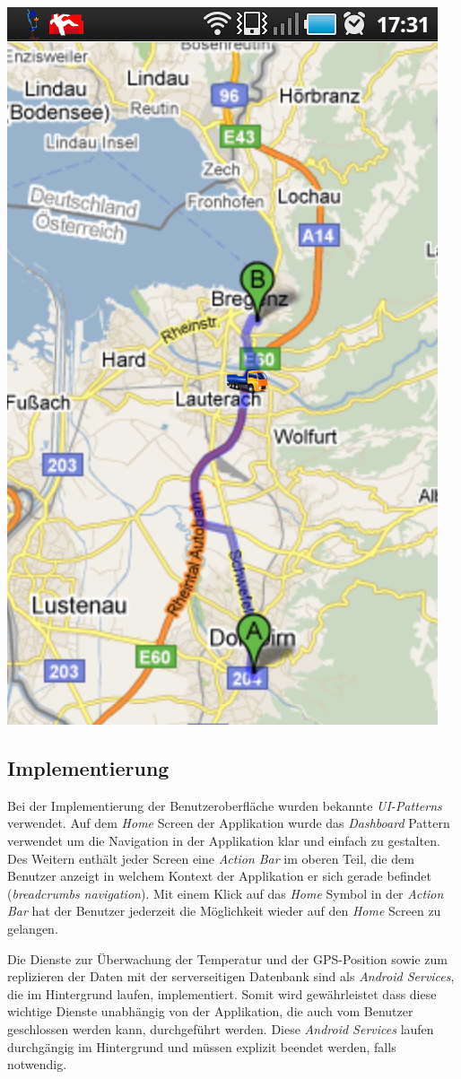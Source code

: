 \includegraphics{../files/android_app_map.png}

\subsection{Implementierung}

Bei der Implementierung der Benutzeroberfläche wurden bekannte \emph{UI-Patterns} verwendet. Auf dem \emph{Home} Screen der Applikation
wurde das \emph{Dashboard} Pattern verwendet um die Navigation in der Applikation klar und einfach zu gestalten. Des Weitern enthält jeder
Screen eine \emph{Action Bar} im oberen Teil, die dem Benutzer anzeigt in welchem Kontext der Applikation er sich gerade befindet (\emph{breadcrumbs navigation}).
Mit einem Klick auf das \emph{Home} Symbol in der \emph{Action Bar} hat der Benutzer jederzeit die Möglichkeit wieder auf den \emph{Home} Screen zu gelangen.

Die Dienste zur Überwachung der Temperatur und der GPS-Position sowie zum replizieren der Daten mit der serverseitigen Datenbank sind als \emph{Android Services},
die im Hintergrund laufen, implementiert. Somit wird gewährleistet dass diese wichtige Dienste unabhängig von der Applikation, die auch vom Benutzer geschlossen werden kann,
durchgeführt werden. Diese \emph{Android Services} laufen durchgängig im Hintergrund und müssen explizit beendet werden, falls notwendig.


